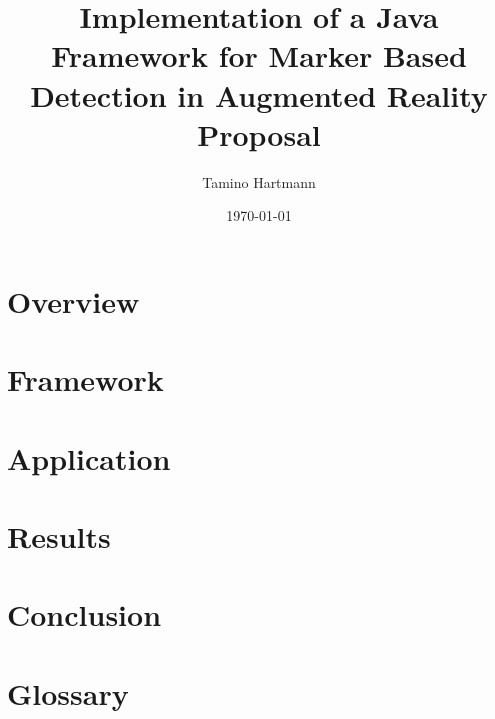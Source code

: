 \documentclass[a4paper,twoside]{article}
\begin{document}
\title{Implementation of a Java Framework for Marker Based Detection in Augmented Reality \\ {\large Proposal}}
\author{Tamino Hartmann}
\date{\today}

\maketitle
\thispagestyle{empty}



\newpage
\mbox{}

\newpage

\tableofcontents

\newpage
\section{Overview}

\newpage
\section{Framework}

\newpage
\section{Application}

\newpage
\section{Results}

\newpage
\section{Conclusion}

\newpage
\section*{Glossary}


\listoffigures

\end{document}
